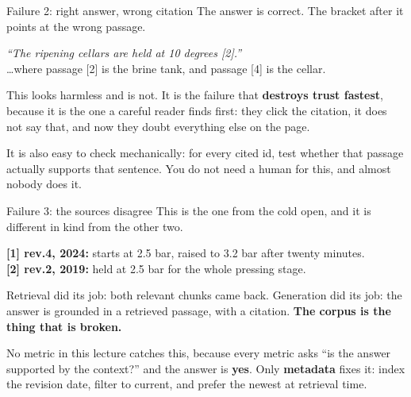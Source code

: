 \documentclass[aspectratio=169]{beamer}
\newcommand{\trapbox}[1]{%
  \begin{tcolorbox}[colback=armred!8, colframe=armred, boxrule=0.6pt, arc=2pt]
  #1
  \end{tcolorbox}}
\newcommand{\watchbox}[1]{%
  \begin{tcolorbox}[colback=armorange!12, colframe=armorange, boxrule=0.6pt, arc=2pt]
  #1
  \end{tcolorbox}}
\begin{document}
\begin{frame}{Failure 2: right answer, wrong citation}
  \vspace{0.7em}
  The answer is correct. The bracket after it points at the wrong passage.

  \vspace{0.9em}
  \begin{center}
  \begin{tcolorbox}[colback=lightbg, colframe=gray, boxrule=0.5pt, arc=2pt, width=0.9\textwidth]
    \small
    \textit{``The ripening cellars are held at 10 degrees [2].''}\\[0.3em]
    \ldots where passage [2] is the brine tank, and passage [4] is the cellar.
  \end{tcolorbox}
  \end{center}

  \vspace{0.9em}
  This looks harmless and is not. It is the failure that \textbf{destroys trust fastest},
  because it is the one a careful reader finds first: they click the citation, it does not
  say that, and now they doubt everything else on the page.

  \vspace{0.8em}
  \watchbox{It is also easy to check mechanically: for every cited id, test whether that
  passage actually supports that sentence. You do not need a human for this, and almost
  nobody does it.}
\end{frame}

\begin{frame}{Failure 3: the sources disagree}
  \vspace{0.6em}
  This is the one from the cold open, and it is different in kind from the other two.

  \vspace{0.9em}
  \begin{center}
  \begin{tcolorbox}[colback=lightbg, colframe=gray, boxrule=0.5pt, arc=2pt, width=0.92\textwidth]
    \small
    \textbf{[1] rev.4, 2024:} starts at 2.5 bar, raised to 3.2 bar after twenty minutes.\\
    \textbf{[2] rev.2, 2019:} held at 2.5 bar for the whole pressing stage.
  \end{tcolorbox}
  \end{center}

  \vspace{0.9em}
  Retrieval did its job: both relevant chunks came back. Generation did its job: the answer
  is grounded in a retrieved passage, with a citation. \textbf{The corpus is the thing that
  is broken.}

  \vspace{0.9em}
  \trapbox{No metric in this lecture catches this, because every metric asks ``is the answer
  supported by the context?'' and the answer is \textbf{yes}. Only \textbf{metadata} fixes
  it: index the revision date, filter to current, and prefer the newest at retrieval time.}
\end{frame}
\end{document}
